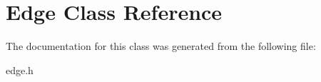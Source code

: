 \hypertarget{class_edge}{}\section{Edge Class Reference}
\label{class_edge}


The documentation for this class was generated from the following file\+:\begin{DoxyCompactItemize}
\item 
edge.\+h\end{DoxyCompactItemize}

